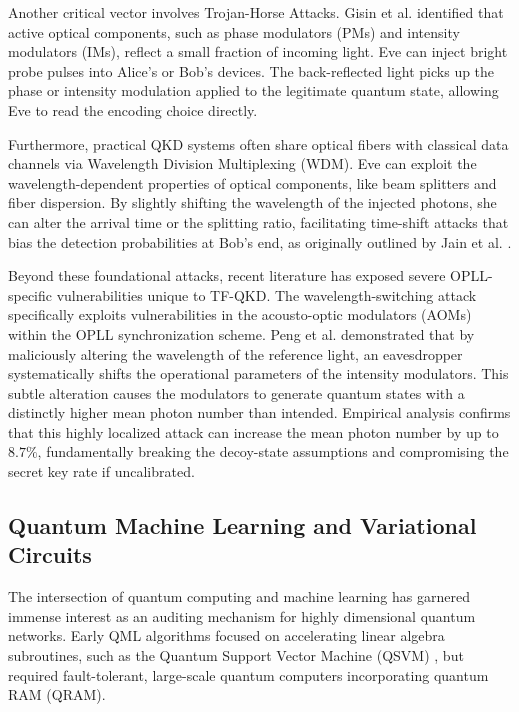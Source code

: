 \documentclass[10pt, journal, letterpaper, twocolumn]{IEEEtran}
\begin{document}
Another critical vector involves Trojan-Horse Attacks. Gisin et al. \cite{gisin} identified that active optical components, such as phase modulators (PMs) and intensity modulators (IMs), reflect a small fraction of incoming light. Eve can inject bright probe pulses into Alice's or Bob's devices. The back-reflected light picks up the phase or intensity modulation applied to the legitimate quantum state, allowing Eve to read the encoding choice directly.

Furthermore, practical QKD systems often share optical fibers with classical data channels via Wavelength Division Multiplexing (WDM). Eve can exploit the wavelength-dependent properties of optical components, like beam splitters and fiber dispersion. By slightly shifting the wavelength of the injected photons, she can alter the arrival time or the splitting ratio, facilitating time-shift attacks that bias the detection probabilities at Bob's end, as originally outlined by Jain et al. \cite{jain}.

Beyond these foundational attacks, recent literature has exposed severe OPLL-specific vulnerabilities unique to TF-QKD. The wavelength-switching attack specifically exploits vulnerabilities in the acousto-optic modulators (AOMs) within the OPLL synchronization scheme. Peng et al. \cite{peng} demonstrated that by maliciously altering the wavelength of the reference light, an eavesdropper systematically shifts the operational parameters of the intensity modulators. This subtle alteration causes the modulators to generate quantum states with a distinctly higher mean photon number than intended. Empirical analysis confirms that this highly localized attack can increase the mean photon number by up to $8.7\%$, fundamentally breaking the decoy-state assumptions and compromising the secret key rate if uncalibrated.

\subsection{Quantum Machine Learning and Variational Circuits}
The intersection of quantum computing and machine learning has garnered immense interest as an auditing mechanism for highly dimensional quantum networks. Early QML algorithms focused on accelerating linear algebra subroutines, such as the Quantum Support Vector Machine (QSVM) \cite{qsvm}, but required fault-tolerant, large-scale quantum computers incorporating quantum RAM (QRAM).
\end{document}
